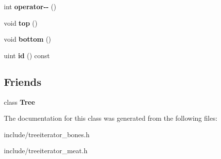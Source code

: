 \begin{DoxyCompactItemize}
\item 
int {\bfseries operator-\/-\/} ()\hypertarget{classTreeIterator_a08d18c38de3157a78b9d02899a605ed8}{}\label{classTreeIterator_a08d18c38de3157a78b9d02899a605ed8}

\item 
void {\bfseries top} ()\hypertarget{classTreeIterator_a41f74b1ac47cd05ce7e08b46c93034f1}{}\label{classTreeIterator_a41f74b1ac47cd05ce7e08b46c93034f1}

\item 
void {\bfseries bottom} ()\hypertarget{classTreeIterator_a1c8244cded3c2a573d2914549a19e177}{}\label{classTreeIterator_a1c8244cded3c2a573d2914549a19e177}

\item 
uint {\bfseries id} () const \hypertarget{classTreeIterator_a80badcbb276e0aa78216f5ef6ff91b62}{}\label{classTreeIterator_a80badcbb276e0aa78216f5ef6ff91b62}

\end{DoxyCompactItemize}
\subsection*{Friends}
\begin{DoxyCompactItemize}
\item 
class {\bfseries Tree}\hypertarget{classTreeIterator_a4b682814d14447120dd184fd300deade}{}\label{classTreeIterator_a4b682814d14447120dd184fd300deade}

\end{DoxyCompactItemize}


The documentation for this class was generated from the following files\+:\begin{DoxyCompactItemize}
\item 
include/treeiterator\+\_\+bones.\+h\item 
include/treeiterator\+\_\+meat.\+h\end{DoxyCompactItemize}
